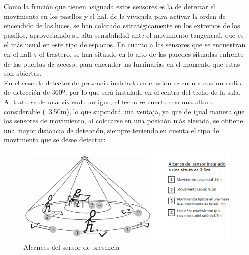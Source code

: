 Como la función que tienen asignada estos sensores es la de detectar el movimiento en los pasillos y el hall de la vivienda para activar la orden de encendido de las luces, se han colocado estratégicamente en los extremos de los pasillos, aprovechando su alta sensibilidad ante el movimiento tangencial, que es el más usual en este tipo de espacios. En cuanto a los sensores que se encuentran en el hall y el trastero, se han situado en lo alto de las paredes situadas enfrente de las puertas de acceso, para encender las luminarias en el momento que estas son abiertas.\\
En el caso de detector de presencia instalado en el salón se cuenta con un radio de detección de 360º, por lo que será instalado en el centro del techo de la sala. Al tratarse de una vivienda antigua, el techo se cuenta con una altura considerable (~3,50m), lo que supondrá una ventaja, ya que de igual manera que los sensores de movimiento, al colocarse en una posición más elevada, se obtiene una mayor distancia de detección, siempre teniendo en cuenta el tipo de movimiento que se desee detectar:
\begin{figure}[H]
\includegraphics[width=1.15\textwidth]{figures/alcance_presencia.png}   
\caption{Alcances del sensor de presencia}
\label{fig:alcance_presencia}
\end{figure}

